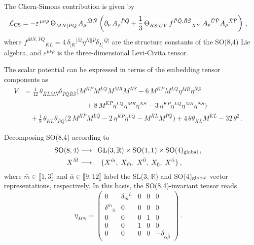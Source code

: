 \documentclass[11pt]{article}
\newcommand{\bK}{{\bar{K}}}
\newcommand{\bL}{{\bar{L}}}
\newcommand{\bM}{{\bar{M}}}
\newcommand{\bN}{{\bar{N}}}
\newcommand{\bP}{{\bar{P}}}
\newcommand{\bQ}{{\bar{Q}}}
\newcommand{\bR}{{\bar{R}}}
\newcommand{\bS}{{\bar{S}}}
\newcommand{\bzero}{{\bar{0}}}
\newcommand{\balpha}{{\bar{\alpha}}}
\newcommand{\bbeta}{{\bar{\beta}}}
\begin{document}
The Chern-Simons contribution is given by
%
\begin{equation}
	{\cal L}_{\rm CS}= -\varepsilon^{\,\mu\nu\rho}\,\Theta_{\bar M\bar N|\bar P\bar Q}\,A_{\mu}{}^{\bar M\bar N}\left(\partial_{\nu}\,A_{\rho}{}^{\bar P\bar Q}  + \frac{1}{3}\, \Theta_{\bar R\bar S|\bar U\bar V}\,f^{\bar P\bar Q,\bar R\bar S}{}_{\bar X\bar Y}\, A_{\nu}{}^{\bar U\bar V} A_{\rho}{}^{\bar X\bar Y} \right)\,,
\end{equation}
%
where $f^{\bar M\bar N,\bar P\bar Q}{}_{\bar K\bar L} = 4\,\delta_{[\bar K}{}^{[\bar M}\eta^{\bar N][\bar P}\delta_{\bar L]}{}^{\bar Q]}$ are the structure constants of the SO(8,4) Lie algebra, and $\varepsilon^{\mu\nu\rho}$ is the three-dimensional Levi-Civita tensor.

The scalar potential can be expressed in terms of the embedding tensor components as
%
{\setlength\arraycolsep{1.2pt}
	\begin{equation}	\label{eq: scalarpot_rephrased}
		\begin{aligned}
			V	&=	\frac1{12}\,\theta_{\bK\bL\bM\bN}\theta_{\bP\bQ\bR\bS}\Big(M^{\bK\bP}M^{\bL\bQ}M^{\bM\bR}M^{\bN\bS}-6\,M^{\bK\bP}M^{\bL\bQ}\eta^{\bM\bR}\eta^{\bN\bS}\\
			&\qquad\qquad\qquad\qquad\quad+8\,M^{\bK\bP}\eta^{\bL\bQ}\eta^{\bM\bR}\eta^{\bN\bS}-3\,\eta^{\bK\bP}\eta^{\bL\bQ}\eta^{\bM\bR}\eta^{\bN\bS}\Big)\\
			&\quad +\frac1{8}\,\theta_{\bK\bL}\theta_{\bP\bQ}\Big(2\,M^{\bK\bP}M^{\bL\bQ}-2\,\eta^{\bK\bP}\eta^{\bL\bQ}-M^{\bK\bL}M^{\bP\bQ}\Big)+4\,\theta\theta_{\bK\bL}M^{\bK\bL}-32\,\theta^2\,.
		\end{aligned}
	\end{equation}
}

Decomposing SO(8,4) according to 
%
\begin{equation}	\label{eq: gl3gradingbar}
	\begin{aligned}
		\text{SO}(8,4)	&\longrightarrow	\enspace \text{GL}(3,\mathbb{R})\times\text{SO}(1,1)\times\text{SO}(4)_{\rm global}\,,	\\
		X^{\bM}		&\longrightarrow	\quad \{X^{\bar m},\; X_{\bar m},\; X^\bzero,\; X_\bzero,\; X^\balpha\}\,,
	\end{aligned}
\end{equation}
where $\bar m\in\llbracket1,3\rrbracket$ and $\balpha\in\llbracket9,12\rrbracket$ label the SL(3, $\mathbb{R}$) and SO(4)$_{\rm global}$ vector representations, respectively. In this basis, the SO(8,4)-invariant tensor reads
%
\begin{equation}	\label{eq: Paulieta}
	\eta_{\bM\bN}=
	\begin{pmatrix}
		0 & \delta_{\bar m}{}^{\bar n} & 0 & 0 &0\\
		\delta^{\bar m}{}_{\bar n} & 0 & 0 & 0 &0\\
		0 & 0 & 0 & 1 & 0\\
		0 & 0 & 1 & 0 & 0\\
		0 & 0 & 0 & 0 & -\delta_{\balpha\bbeta}
	\end{pmatrix}\,.
\end{equation}
\end{document}
